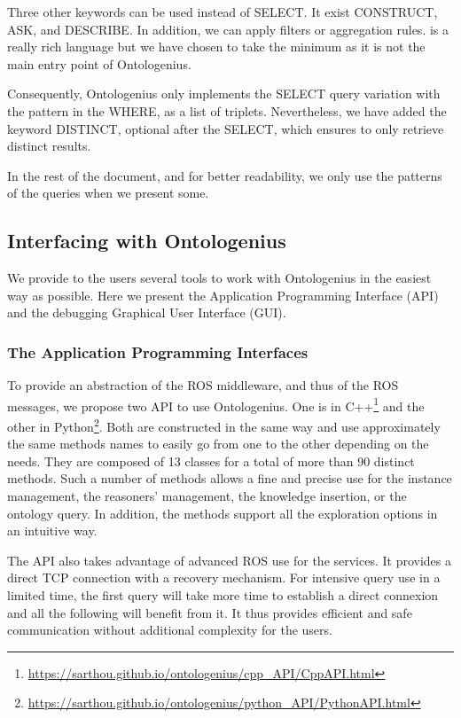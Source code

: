 Three other keywords can be used instead of SELECT. It exist CONSTRUCT, ASK, and DESCRIBE. In addition, we can apply filters or aggregation rules. \sparql{} is a really rich language but we have chosen to take the minimum as it is not the main entry point of Ontologenius.

Consequently, Ontologenius only implements the SELECT query variation with the pattern in the WHERE, as a list of triplets. Nevertheless, we have added the keyword DISTINCT, optional after the SELECT, which ensures to only retrieve distinct results.

In the rest of the document, and for better readability, we only use the patterns of the \sparql{} queries when we present some.

\subsection{Interfacing with Ontologenius}

We provide to the users several tools to work with Ontologenius in the easiest way as possible. Here we present the Application Programming Interface (API) and the debugging Graphical User Interface (GUI).

\subsubsection{The Application Programming Interfaces}

To provide an abstraction of the ROS middleware, and thus of the ROS messages, we propose two API to use Ontologenius. One is in C++\footnote{\url{https://sarthou.github.io/ontologenius/cpp_API/CppAPI.html}} and the other in Python\footnote{\url{https://sarthou.github.io/ontologenius/python_API/PythonAPI.html}}. Both are constructed in the same way and use approximately the same methods names to easily go from one to the other depending on the needs. They are composed of 13 classes for a total of more than 90 distinct methods. Such a number of methods allows a fine and precise use for the instance management, the reasoners' management, the knowledge insertion, or the ontology query. In addition, the methods support all the exploration options in an intuitive way.

The API also takes advantage of advanced ROS use for the services. It provides a direct TCP connection with a recovery mechanism. For intensive query use in a limited time, the first query will take more time to establish a direct connexion and all the following will benefit from it. It thus provides efficient and safe communication without additional complexity for the users.

